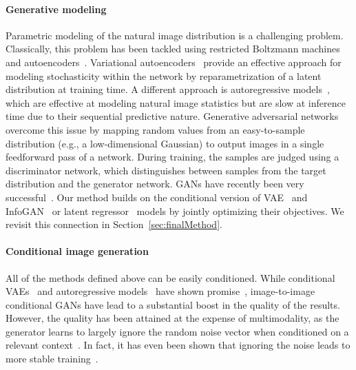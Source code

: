 \paragraph{Generative modeling}
Parametric modeling of the natural image distribution is a challenging problem. Classically, this problem has been tackled using restricted Boltzmann machines~\citep{smolensky1986information} and autoencoders~\citep{hinton2006reducing,vincent2008extracting}. 
Variational autoencoders~\citep{kingma2013auto} provide an effective approach for modeling stochasticity within the network by reparametrization of a latent distribution at training time.
A different approach is autoregressive models~\citep{efros1999texture,van2016pixel,oord2016conditional}, which are effective at modeling natural image statistics but are slow at inference time due to their sequential predictive nature.
Generative adversarial networks~\citep{goodfellow2014generative} overcome this issue by mapping random values from an easy-to-sample distribution (e.g., a low-dimensional Gaussian) to output images in a single feedforward pass of a network. During training, the samples are judged using a discriminator network, which distinguishes between samples from the target distribution and the generator network.
GANs have recently been very successful~\citep{denton2015deep,radford2015unsupervised,donahue2016adversarial,dumoulin2016adversarially,reed2016generative,zhao2016energy,zhu2016generative,arjovsky2017wgan,zhang2016stackgan,xi2016infogan}. Our method builds on the conditional version of VAE~\citep{kingma2013auto} and InfoGAN~\citep{xi2016infogan} or latent regressor~\citep{donahue2016adversarial,dumoulin2016adversarially} models by jointly optimizing their objectives. We revisit this connection in Section~\ref{sec:finalMethod}.

\paragraph{Conditional image generation} All of the methods defined above can be easily conditioned. While conditional VAEs~\citep{sohn2015cvae} and
autoregressive models~\citep{oord2016conditional,van2016pixel} have shown promise~\citep{walker2016uncertain,xue2016visual,guadarrama2017pixcolor}, image-to-image conditional GANs have lead to a substantial boost in the quality of the results. However, the quality has been attained at the expense of multimodality, as the generator learns to largely ignore the random noise vector when conditioned on a relevant context~\citep{pathakCVPR16context,sangkloy2017scribbler,xian2017texturegan,yang2016high,isola2016image,zhu2017unpaired}. 
In fact, it has even been shown that ignoring the noise leads to more stable training~\citep{mathieu2015deep,pathakCVPR16context,isola2016image}.

